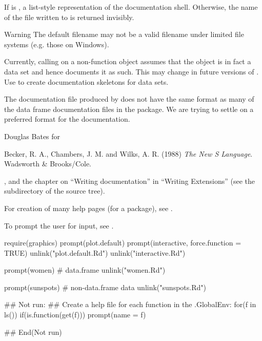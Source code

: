 %
\begin{Value}
If  is , a list-style representation of the
documentation shell.  Otherwise, the name of the file written to is
returned invisibly.
\end{Value}
%
\begin{Section}{Warning}
The default filename may not be a valid filename under limited file
systems (e.g. those on Windows).

Currently, calling  on a non-function object assumes that
the object is in fact a data set and hence documents it as such.  This
may change in future versions of \R{}.  Use  to
create documentation skeletons for data sets.
\end{Section}
%
\begin{Note}\relax
The documentation file produced by  does not
have the same format as many of the data frame documentation files in
the  package.  We are trying to settle on a preferred
format for the documentation.
\end{Note}
%
\begin{Author}\relax
Douglas Bates for 
\end{Author}
%
\begin{References}\relax
Becker, R. A., Chambers, J. M. and Wilks, A. R. (1988)
\emph{The New S Language}.
Wadsworth \& Brooks/Cole.
\end{References}
%
\begin{SeeAlso}\relax
{},  and the chapter on
``Writing \R{} documentation'' in ``Writing \R{} Extensions''
(see the  subdirectory of the \R{} source tree).

For creation of many help pages (for a package),
see .

To prompt the user for input, see .
\end{SeeAlso}
%
\begin{Examples}
\begin{ExampleCode}
require(graphics)
prompt(plot.default)
prompt(interactive, force.function = TRUE)
unlink("plot.default.Rd")
unlink("interactive.Rd")

prompt(women) # data.frame
unlink("women.Rd")

prompt(sunspots) # non-data.frame data
unlink("sunspots.Rd")

## Not run: 
## Create a help file for each function in the .GlobalEnv:
for(f in ls()) if(is.function(get(f))) prompt(name = f)

## End(Not run)

\end{ExampleCode}
\end{Examples}
